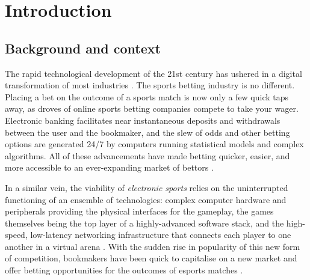 \chapter{Introduction}
\label{Introduction}

%

\section{Background and context}

The rapid technological development of the 21st century has ushered in a digital transformation of most industries \cite{wef-tech}. The sports betting industry is no different. Placing a bet on the outcome of a sports match is now only a few quick taps away, as droves of online sports betting companies compete to take your wager. Electronic banking facilitates near instantaneous deposits and withdrawals between the user and the bookmaker, and the slew of odds and other betting options are generated 24/7 by computers running statistical models and complex algorithms. All of these advancements have made betting quicker, easier, and more accessible to an ever-expanding market of bettors \cite{structuresportsbetting}.

In a similar vein, the viability of \textit{electronic sports} relies on the uninterrupted functioning of an ensemble of technologies: complex computer hardware and peripherals providing the physical interfaces for the gameplay, the games themselves being the top layer of a highly-advanced software stack, and the high-speed, low-latency networking infrastructure that connects each player to one another in a virtual arena \cite{proesports-book}. With the sudden rise in popularity of this new form of competition, bookmakers have been quick to capitalise on a new market and offer betting opportunities for the outcomes of esports matches \cite{sizesportsbetting}.
 

